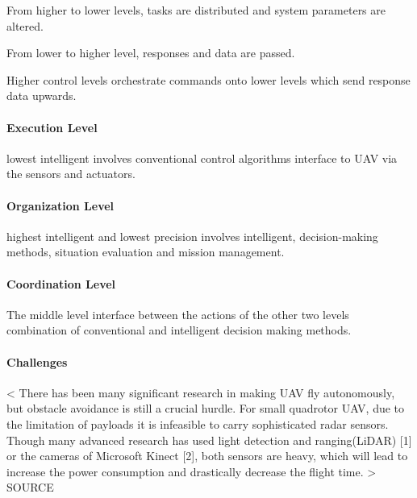 From higher to lower levels,
tasks are distributed and
system parameters are altered.

From lower to higher level,
responses and data are passed.


Higher control levels orchestrate commands
onto lower levels which send response 
data upwards.

\paragraph{Execution Level}

lowest  intelligent
involves  conventional  control  algorithms
interface  to  UAV  via  the  sensors  and  actuators.  

\paragraph{Organization Level}

highest   intelligent    and    lowest    precision
involves    intelligent,    decision-making  methods,  
situation  evaluation  and  mission  management.  

\paragraph{Coordination Level}

The  middle  level
interface between the actions of the other  two  levels  
combination  of  conventional  and   intelligent   decision   making   methods.   





 
  







\paragraph{Challenges}





<
There  has  been  many  significant  research  in  making  UAV  fly  autonomously,  but  obstacle  avoidance  is  still  a  crucial   hurdle.   For   small   quadrotor   UAV,   due   to   the   limitation  of  payloads  it  is  infeasible  to  carry  sophisticated  radar  sensors.  Though  many  advanced  research  has  used  light  detection  and  ranging(LiDAR)  [1]  or  the  cameras  of  Microsoft Kinect [2], both sensors are heavy, which will lead to  increase  the  power  consumption  and  drastically  decrease  the flight time.
>
SOURCE 

